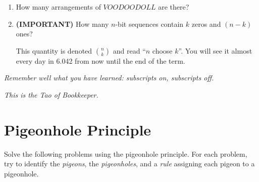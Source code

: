 \documentclass[12pt]{article}
\begin{document}
\begin{enumerate}

\item How many arrangements of $VOODOODOLL$ are there?


\item \textbf{(IMPORTANT) } How many $n$-bit sequences contain $k$
zeros and $(n-k)$ ones?


This quantity is denoted $\binom{n}{k}$ and read ``$n$ choose $k$''.
You will see it almost every day in 6.042 from now until the end of
the term.

\end{enumerate}

\vspace{0.5in}

\begin{center}
\textit{Remember well what you have learned: subscripts on, subscripts off.}

\textit{This is the Tao of Bookkeeper.}
\end{center}


\instatements{\newpage}

\section{Pigeonhole Principle}

Solve the following problems using the pigeonhole principle.  For each
problem, try to identify the {\em pigeons}, the {\em pigeonholes}, and
a {\em rule} assigning each pigeon to a pigeonhole.
\end{document}
